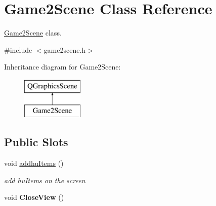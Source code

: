\hypertarget{classGame2Scene}{\section{Game2\-Scene Class Reference}
\label{classGame2Scene}
}


\hyperlink{classGame2Scene}{Game2\-Scene} class.  




{\ttfamily \#include $<$game2scene.\-h$>$}

Inheritance diagram for Game2\-Scene\-:\begin{figure}[H]
\begin{center}
\leavevmode
\includegraphics[height=2.000000cm]{classGame2Scene}
\end{center}
\end{figure}
\subsection*{Public Slots}
\begin{DoxyCompactItemize}
\item 
void \hyperlink{classGame2Scene_a7d832a1e88a9f6205dc58c806f118ecd}{addhu\-Items} ()
\begin{DoxyCompactList}\small\item\em add hu\-Items on the screen \end{DoxyCompactList}\item 
\hypertarget{classGame2Scene_a7a0475c2a2578482c27d04bc90499c6e}{void {\bfseries Close\-View} ()}\label{classGame2Scene_a7a0475c2a2578482c27d04bc90499c6e}

\end{DoxyCompactItemize}
